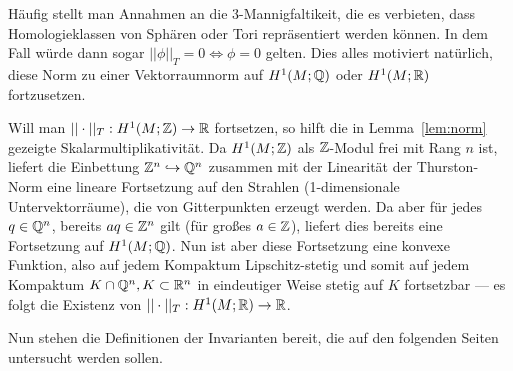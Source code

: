         Häufig stellt man Annahmen an die 3-Mannigfaltikeit, die es verbieten, dass Homologieklassen von Sphären oder Tori repräsentiert werden können. In dem Fall würde dann sogar $||\phi||_T=0 \Leftrightarrow \phi=0$ gelten. Dies alles motiviert natürlich, diese Norm zu einer Vektorraumnorm auf $H^1(M;\mathbb{Q})$ oder $H^1(M;\mathbb{R})$ fortzusetzen. 
        \begin{bem}
        \label{rem:extendingthurston}
            Will man $||\cdot||_T: H^1(M;\mathbb{Z}) \to \mathbb{R}$ fortsetzen, so hilft die in Lemma~\ref{lem:norm} gezeigte Skalarmultiplikativität. Da $H^1(M;\mathbb{Z})$ als $\mathbb{Z}$-Modul frei mit Rang $n$ ist, liefert die Einbettung $\mathbb{Z}^n \hookrightarrow \mathbb{Q}^n$ zusammen mit der Linearität der Thurston-Norm eine lineare Fortsetzung auf den Strahlen (1-dimensionale Untervektorräume), die von Gitterpunkten erzeugt werden. Da aber für jedes $q \in \mathbb{Q}^n$, bereits $aq \in \mathbb{Z}^n$ gilt (für großes $a\in \mathbb{Z}$), liefert dies bereits eine Fortsetzung auf $H^1(M;\mathbb{Q})$. Nun ist aber diese Fortsetzung eine konvexe Funktion, also auf jedem Kompaktum Lipschitz-stetig und somit auf jedem Kompaktum $K\cap \mathbb{Q}^n, K\subset \mathbb{R}^n$ in eindeutiger Weise stetig auf $K$ fortsetzbar --- es folgt die Existenz von $||\cdot||_T:H^1(M;\mathbb{R}) \to \mathbb{R}$.
        \end{bem}
        Nun stehen die Definitionen der Invarianten bereit, die auf den folgenden Seiten untersucht werden sollen.